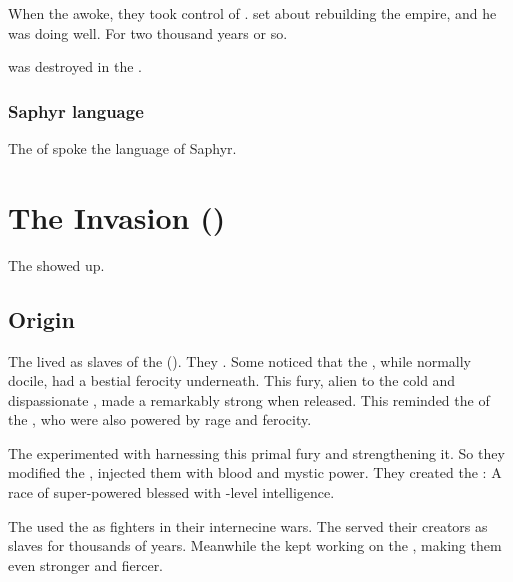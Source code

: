 When the \dragons awoke, they took control of \Saphyrae. 
\Nexagglachel set about rebuilding the \ophidian empire, and he was doing well. 
For two thousand years or so. 

\Saphyrae was destroyed in the \secondbanewar. 





\subsubsection{Saphyr language}
The \caisith of \Saphyrae spoke the language of Saphyr.















\section{The \Aryoth Invasion ()}
The \aryothim{} showed up. 





\subsection{Origin}
The \nephilim lived as slaves of the \ophidians (). 
They .
Some \ophidians noticed that the \nephilim, while normally docile, had a bestial ferocity underneath.
This fury, alien to the cold and dispassionate \ophidians, made a \nephil remarkably strong when released. 
This reminded the \ophidians of the \dragons, who were also powered by rage and ferocity.

The \ophidians experimented with harnessing this primal fury and strengthening it.
So they modified the \nephilim, injected them with \daemonic blood and mystic power.
They created the \aryothim:
A race of super-powered \nephilim blessed with \quiljaar-level intelligence.

The \ophidians used the \aryothim as fighters in their internecine wars. 
The \aryothim served their creators as slaves for thousands of years.
Meanwhile the \ophidians kept working on the \aryothim, making them even stronger and fiercer. 

